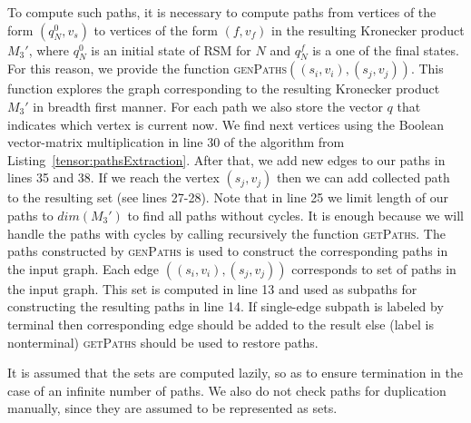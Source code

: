 To compute such paths, it is necessary to compute paths from vertices of the form $(q_N^0,v_s)$ to vertices of the form $(f, v_f)$ in the resulting Kronecker product $M_3'$, where $q_N^0$ is an initial state of RSM for $N$ and $q_N^f$ is a one of the final states.
For this reason, we provide the function \textsc{genPaths}$((s_i,v_i),(s_j,v_j))$. This function explores the graph corresponding to the resulting Kronecker product $M_3'$ in breadth first manner. For each path we also store the vector $q$ that indicates which vertex is current now. We find next vertices using the Boolean vector-matrix multiplication in line 30 of the algorithm from Listing~\ref{tensor:pathsExtraction}. After that, we add new edges to our paths in lines 35 and 38. If we reach the vertex $(s_j,v_j)$ then we can add collected path to the resulting set (see lines 27-28). Note that in line 25 we limit length of our paths to $dim(M_3')$ to find all paths without cycles. It is enough because we will handle the paths with cycles by calling recursively the function \textsc{getPaths}.
The paths constructed by \textsc{genPaths} is used to construct the corresponding paths in the input graph. Each edge $((s_i,v_i),(s_j,v_j))$ corresponds to set of paths in the input graph. This set is computed in line 13 and used as subpaths for constructing the resulting paths in line 14. If single-edge subpath is labeled by terminal then corresponding edge should be added to the result else (label is nonterminal) \textsc{getPaths} should be used to restore paths.

It is assumed that the sets are computed lazily, so as to ensure termination in the case of an infinite number of paths.
We also do not check paths for duplication manually, since they are assumed to be represented as sets.
